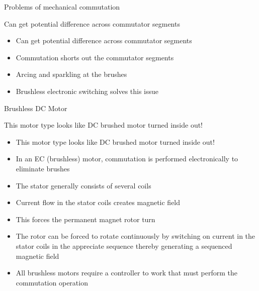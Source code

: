 \documentclass[compress]{beamer}
\begin{document}
\begin{frame}{Problems of mechanical commutation}

Can get potential difference across commutator segments

\begin{itemize}

\item Can get potential difference across commutator segments
\item Commutation shorts out the commutator segments
\item Arcing and sparkling at the brushes
\item Brushless electronic switching solves this issue
\end{itemize}

\end{frame}

\begin{frame}{Brushless DC Motor}

This motor type looks like DC brushed motor turned inside out!

\begin{itemize}

\item This motor type looks like DC brushed motor turned inside out!
\item In an EC (brushless) motor, commutation is performed electronically to
  eliminate brushes
\item The stator generally consists of several coils
\item Current flow in the stator coils creates magnetic field
\item This forces the permanent magnet rotor turn
\item The rotor can be forced to rotate continuously by switching on current
  in the stator coils in the appreciate sequence thereby generating a
  sequenced magnetic field
\item All brushless motors require a controller to work that must perform
  the commutation operation
\end{itemize}

\end{frame}

\end{document}
